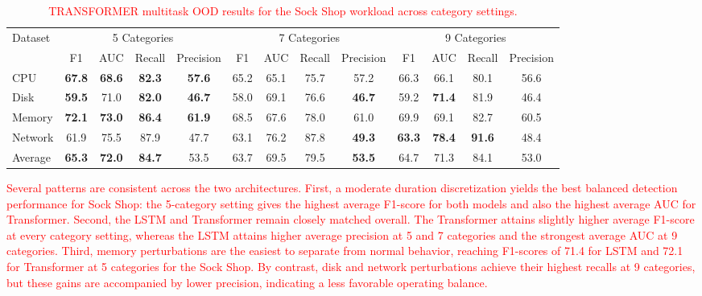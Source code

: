 \documentclass[preprint,12pt]{elsarticle}
\begin{document}
\begin{table}[tb]
\centering
\caption{\textcolor{red}{TRANSFORMER multitask OOD results for the Sock Shop workload across category settings.}}
\label{tab:transformer_multitask_all_metrics}
{\color{red}
\begin{adjustbox}{center, width=0.7\textwidth}
\begin{tabular}{|l|cccc|cccc|cccc|}
\hline
\multirow{2}{*}{Dataset}
& \multicolumn{4}{c|}{5 Categories}
& \multicolumn{4}{c|}{7 Categories}
& \multicolumn{4}{c|}{9 Categories} \\
 & F1 & AUC & Recall & Precision
 & F1 & AUC & Recall & Precision
 & F1 & AUC & Recall & Precision \\
\hline
CPU     & \textbf{67.8} & \textbf{68.6} & \textbf{82.3} & \textbf{57.6} & 65.2 & 65.1 & 75.7 & 57.2 & 66.3 & 66.1 & 80.1 & 56.6 \\
Disk    & \textbf{59.5} & 71.0 & \textbf{82.0} & \textbf{46.7} & 58.0 & 69.1 & 76.6 & \textbf{46.7} & 59.2 & \textbf{71.4} & 81.9 & 46.4 \\
Memory  & \textbf{72.1} & \textbf{73.0} & \textbf{86.4} & \textbf{61.9} & 68.5 & 67.6 & 78.0 & 61.0 & 69.9 & 69.1 & 82.7 & 60.5 \\
Network & 61.9 & 75.5 & 87.9 & 47.7 & 63.1 & 76.2 & 87.8 & \textbf{49.3} & \textbf{63.3} & \textbf{78.4} & \textbf{91.6} & 48.4 \\
\hline
Average & \textbf{65.3} & \textbf{72.0} & \textbf{84.7} & 53.5 & 63.7 & 69.5 & 79.5 & \textbf{53.5} & 64.7 & 71.3 & 84.1 & 53.0 \\
\hline
\end{tabular}
\end{adjustbox}
}
\end{table}

\textcolor{red}{Several patterns are consistent across the two architectures. First, a moderate duration discretization yields the best balanced detection performance for Sock Shop: the 5-category setting gives the highest average F1-score for both models and also the highest average AUC for Transformer. Second, the LSTM and Transformer remain closely matched overall. The Transformer attains slightly higher average F1-score at every category setting, whereas the LSTM attains higher average precision at 5 and 7 categories and the strongest average AUC at 9 categories. Third, memory perturbations are the easiest to separate from normal behavior, reaching F1-scores of 71.4 for LSTM and 72.1 for Transformer at 5 categories for the Sock Shop. By contrast, disk and network perturbations achieve their highest recalls at 9 categories, but these gains are accompanied by lower precision, indicating a less favorable operating balance.}
\end{document}
